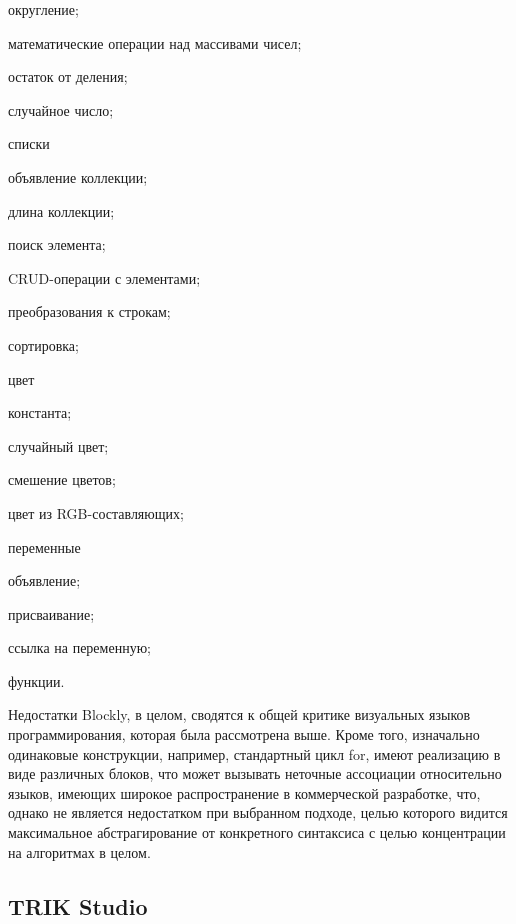 \begin{itemize*}
\begin{itemize*}
		\item округление;
		\item математические операции над массивами чисел;
		\item остаток от деления;
		\item случайное число;
	\end{itemize*}
	\item списки
	\begin{itemize*}
		\item объявление коллекции;
		\item длина коллекции;
		\item поиск элемента;
		\item CRUD-операции с элементами;
		\item преобразования к строкам;
		\item сортировка;
	\end{itemize*}
	\item цвет
	\begin{itemize*}
		\item константа;
		\item случайный цвет;
		\item смешение цветов;
		\item цвет из RGB-составляющих;
	\end{itemize*}
	\item переменные
	\begin{itemize*}
		\item объявление;
		\item присваивание;
		\item ссылка на переменную;
	\end{itemize*}
	\item функции.
\end{itemize*}

Недостатки Blockly, в целом, сводятся к общей критике визуальных языков программирования, которая была рассмотрена выше. Кроме того, изначально одинаковые конструкции, например, стандартный цикл for, имеют реализацию в виде различных блоков, что может вызывать неточные ассоциации относительно языков, имеющих широкое распространение в коммерческой разработке, что, однако не является недостатком при выбранном подходе, целью которого видится максимальное абстрагирование от конкретного синтаксиса с целью концентрации на алгоритмах в целом.

\subsection{TRIK Studio}

